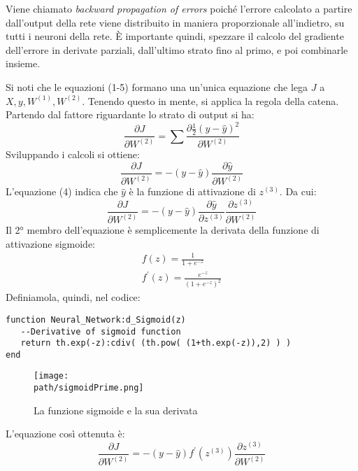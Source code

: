 Viene chiamato \emph{backward propagation of errors} poiché l'errore calcolato a partire dall'output della rete viene distribuito in maniera proporzionale all'indietro, su tutti i neuroni della rete. È importante quindi, spezzare il calcolo del gradiente dell'errore in derivate parziali, dall'ultimo strato fino al primo, e poi combinarle insieme.

Si noti che le equazioni (1-5) formano una un'unica equazione che lega $J$ a $X, y, W^{(1)}, W^{(2)}$. Tenendo questo in mente, si applica la regola della catena. \\
Partendo dal fattore riguardante lo strato di output si ha:
$$
\frac{\partial J}{\partial W^{(2)}} = \sum \frac{\partial \frac{1}{2}(y-\hat{y})^2}{\partial W^{(2)}}
$$
Sviluppando i calcoli si ottiene:
$$
\frac{\partial J}{\partial W^{(2)}} = -(y-\hat{y}) \frac{\partial \hat{y}}{\partial W^{(2)}}
$$
L'equazione (4) indica che $\hat{y}$ è la funzione di attivazione di $z^{(3)}$. Da cui:
$$
\frac{\partial J}{\partial W^{(2)}} =
-(y-\hat{y})
\frac{\partial \hat{y}}{\partial z^{(3)}}
\frac{\partial z^{(3)}}{\partial W^{(2)}}
$$
Il 2° membro dell'equazione è semplicemente la derivata della funzione di attivazione sigmoide:
\begin{align*}
f(z) = \frac{1}{1+e^{-z}}\\
f^\prime(z) = \frac{e^{-z}}{(1+e^{-z})^2}
\end{align*}
Definiamola, quindi, nel codice:
\begin{lstlisting}[language={[5.2]Lua}]
function Neural_Network:d_Sigmoid(z)
   --Derivative of sigmoid function
   return th.exp(-z):cdiv( (th.pow( (1+th.exp(-z)),2) ) )
end
\end{lstlisting}
\begin{figure}[h!]
 \centering
 \texttt{[image: \\path/sigmoidPrime.png]}
 \caption{La funzione sigmoide e la sua derivata}
 \label{fig:sigmoidPrime}
\end{figure}

L'equazione così ottenuta è:
$$
\frac{\partial J}{\partial W^{(2)}}=
-(y-\hat{y}) f^\prime(z^{(3)}) \frac{\partial z^{(3)}}{\partial W^{(2)}}
$$

